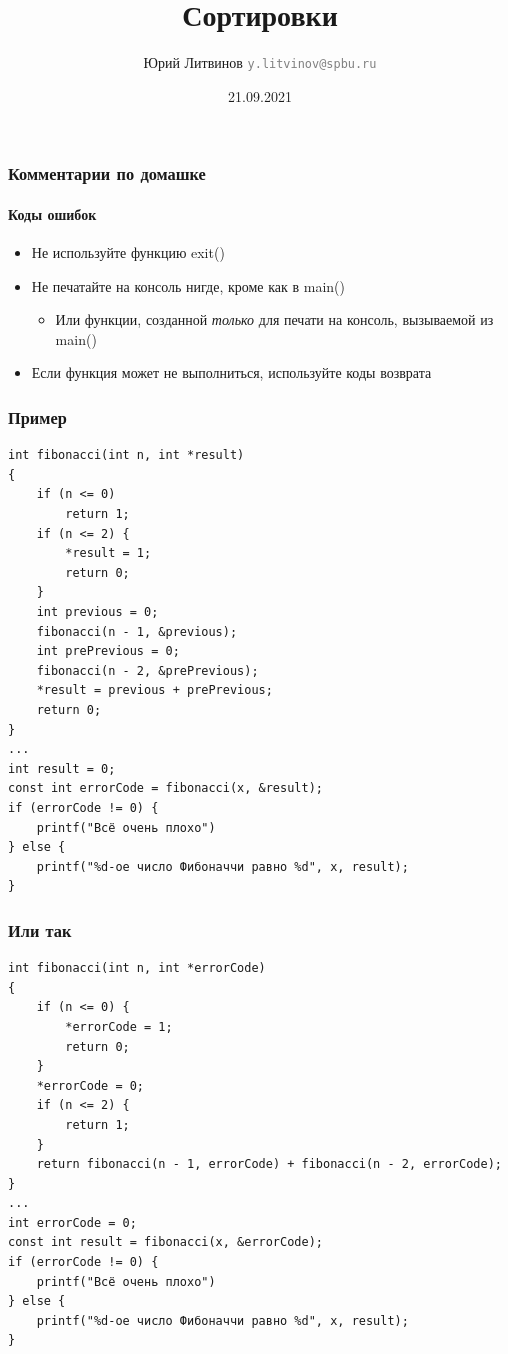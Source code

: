\documentclass[xetex,mathserif,serif]{beamer}
\title{Сортировки}
\author[Юрий Литвинов]{Юрий Литвинов \newline \textcolor{gray}{\small\texttt{y.litvinov@spbu.ru}}}
\date{21.09.2021}
\begin{document}
    
    \frame{\titlepage}

    \begin{frame}
        \frametitle{Комментарии по домашке}
        \framesubtitle{Коды ошибок}
        \begin{itemize}
            \item Не используйте функцию exit()
            \item Не печатайте на консоль нигде, кроме как в main()
            \begin{itemize}
                \item Или функции, созданной \emph{только} для печати на консоль, вызываемой из main()
            \end{itemize}
            \item Если функция может не выполниться, используйте коды возврата
        \end{itemize}
    \end{frame}

    \begin{frame}[fragile]
        \frametitle{Пример}
        \begin{scriptsize}
            \begin{verbatim}
int fibonacci(int n, int *result)
{
    if (n <= 0)
        return 1; 
    if (n <= 2) { 
        *result = 1; 
        return 0;
    }
    int previous = 0;
    fibonacci(n - 1, &previous);
    int prePrevious = 0;
    fibonacci(n - 2, &prePrevious);
    *result = previous + prePrevious;
    return 0;
}
...
int result = 0;
const int errorCode = fibonacci(x, &result);
if (errorCode != 0) {
    printf("Всё очень плохо")
} else {
    printf("%d-ое число Фибоначчи равно %d", x, result);
}
            \end{verbatim}
        \end{scriptsize}
    \end{frame}

    \begin{frame}[fragile]
        \frametitle{Или так}
        \begin{scriptsize}
            \begin{verbatim}
int fibonacci(int n, int *errorCode)
{
    if (n <= 0) {
        *errorCode = 1;
        return 0;
    } 
    *errorCode = 0;
    if (n <= 2) { 
        return 1;
    }
    return fibonacci(n - 1, errorCode) + fibonacci(n - 2, errorCode);
}
...
int errorCode = 0;
const int result = fibonacci(x, &errorCode);
if (errorCode != 0) {
    printf("Всё очень плохо")
} else {
    printf("%d-ое число Фибоначчи равно %d", x, result);
}
            \end{verbatim}
        \end{scriptsize}
    \end{frame}
\end{document}
